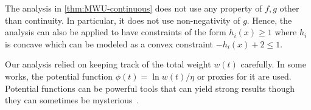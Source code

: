 The analysis in \autoref{thm:MWU-continuous} does not use any property of \(f, g\) other than continuity. In particular, it does not use non-negativity of \(g\). Hence, the analysis can also be applied to have constraints of the form \(h_i(x) \geq 1\)  where \(h_i\) is concave which can be modeled as a convex constraint \(-h_i(x) + 2 \leq 1\).

Our analysis relied on keeping track of the total weight \(w(t)\) carefully. In some works, the potential function \(\phi (t) = \ln w(t) / \eta \) or proxies for it are used. Potential functions can be powerful tools that can yield strong results though they can sometimes be mysterious~\cite{bansal2017potential}.